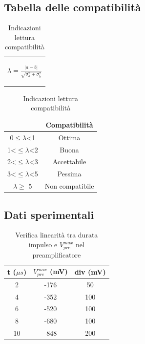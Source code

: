\documentclass{article}
\begin{document}
\subsection{Tabella delle compatibilità}
\medskip
\begin{table}[H]
    \centering
    \begin{tabular}{c}
        \begin{Large}
        $\lambda=\frac{|a-b|}{\sqrt{\sigma_a^2+\sigma_b^2}}$
        \end{Large}\\
    \end{tabular}
    \hspace{0.5cm}
    \begin{tabular}{cc}
        \toprule
        &       \textbf{Compatibilità   }       \\
        \midrule
        0$\leq \lambda$<1   &Ottima                 \\
        1<$\leq \lambda$<2   &Buona                  \\
        2<$\leq \lambda$<3   &Accettabile            \\
        3<$\leq\lambda$<5   &Pessima                \\
        $ \lambda \geq $  5     &Non compatibile        \\
        \bottomrule
    \end{tabular}
    \caption{Indicazioni lettura compatibilità}
\end{table}

\subsection{Dati sperimentali}

\begin{table}[H]
    \centering
    \begin{tabular}{ccc}
        \toprule
        t ($\mu s$) & $V_{pre}^{max}$ (mV) & div (mV) \\
        \midrule
        2 & -176 & 50 \\
        4 & -352 & 100 \\
        6 & -520 & 100 \\
        8 & -680 & 100 \\
        10 & -848 & 200 \\
        \bottomrule
    \end{tabular}
    \caption{Verifica linearità tra durata impulso e $V_{pre}^{max}$ nel preamplificatore}
\end{table}
\end{document}
